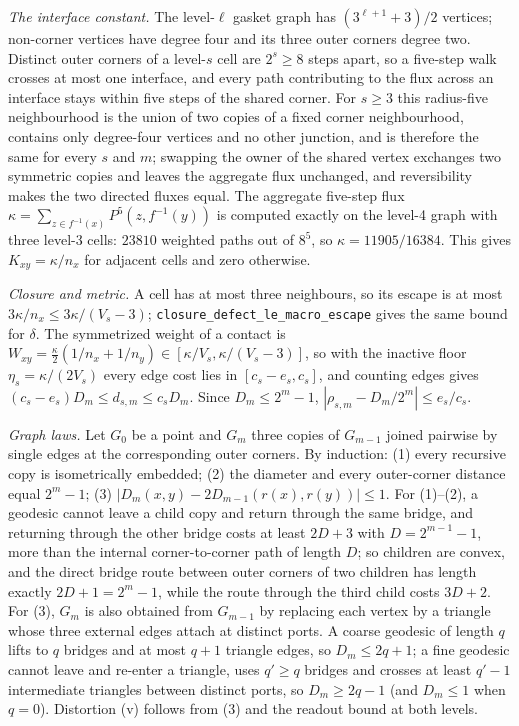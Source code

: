\documentclass[11pt]{article}
\newcommand{\lean}[1]{\nolinkurl{#1}}
\begin{document}
\emph{The interface constant.}
The level-$\ell$ gasket graph has $(3^{\ell+1}+3)/2$ vertices; non-corner vertices have degree four and its three outer corners degree two.
Distinct outer corners of a level-$s$ cell are $2^s\ge8$ steps apart, so a five-step walk crosses at most one interface, and every path contributing to the flux across an interface stays within five steps of the shared corner.
For $s\ge3$ this radius-five neighbourhood is the union of two copies of a fixed corner neighbourhood, contains only degree-four vertices and no other junction, and is therefore the same for every $s$ and $m$; swapping the owner of the shared vertex exchanges two symmetric copies and leaves the aggregate flux unchanged, and reversibility makes the two directed fluxes equal.
The aggregate five-step flux $\kappa=\sum_{z\in f^{-1}(x)}P^5(z,f^{-1}(y))$ is computed exactly on the level-4 graph with three level-3 cells: $23810$ weighted paths out of $8^5$, so $\kappa=11905/16384$.
This gives $K_{xy}=\kappa/n_x$ for adjacent cells and zero otherwise.

\emph{Closure and metric.}
A cell has at most three neighbours, so its escape is at most $3\kappa/n_x\le3\kappa/(V_s-3)$; \lean{closure_defect_le_macro_escape} gives the same bound for $\delta$.
The symmetrized weight of a contact is $W_{xy}=\tfrac\kappa2(1/n_x+1/n_y)\in[\kappa/V_s,\kappa/(V_s-3)]$, so with the inactive floor $\eta_s=\kappa/(2V_s)$ every edge cost lies in $[c_s-e_s,c_s]$, and counting edges gives $(c_s-e_s)D_m\le d_{s,m}\le c_sD_m$.
Since $D_m\le2^m-1$, $|\rho_{s,m}-D_m/2^m|\le e_s/c_s$.

\emph{Graph laws.}
Let $G_0$ be a point and $G_m$ three copies of $G_{m-1}$ joined pairwise by single edges at the corresponding outer corners.
By induction: (1) every recursive copy is isometrically embedded; (2) the diameter and every outer-corner distance equal $2^m-1$; (3) $|D_m(x,y)-2D_{m-1}(r(x),r(y))|\le1$.
For (1)--(2), a geodesic cannot leave a child copy and return through the same bridge, and returning through the other bridge costs at least $2D+3$ with $D=2^{m-1}-1$, more than the internal corner-to-corner path of length $D$; so children are convex, and the direct bridge route between outer corners of two children has length exactly $2D+1=2^m-1$, while the route through the third child costs $3D+2$.
For (3), $G_m$ is also obtained from $G_{m-1}$ by replacing each vertex by a triangle whose three external edges attach at distinct ports.
A coarse geodesic of length $q$ lifts to $q$ bridges and at most $q+1$ triangle edges, so $D_m\le2q+1$; a fine geodesic cannot leave and re-enter a triangle, uses $q'\ge q$ bridges and crosses at least $q'-1$ intermediate triangles between distinct ports, so $D_m\ge2q-1$ (and $D_m\le1$ when $q=0$).
Distortion (v) follows from (3) and the readout bound at both levels.
\end{document}
